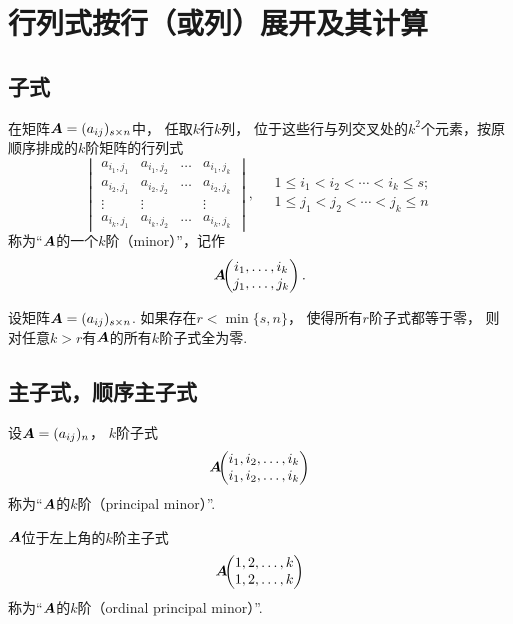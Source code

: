 \section{行列式按行（或列）展开及其计算}
\subsection{子式}
\begin{definition}
在矩阵\(\boldsymbol{A}=(a_{ij})_{s \times n}\)中，
任取\(k\)行\(k\)列，
位于这些行与列交叉处的\(k^2\)个元素，按原顺序排成的\(k\)阶矩阵的行列式\[
	\begin{vmatrix}
		a_{i_1,j_1} & a_{i_1,j_2} & \dots & a_{i_1,j_k} \\
		a_{i_2,j_1} & a_{i_2,j_2} & \dots & a_{i_2,j_k} \\
		\vdots & \vdots & & \vdots \\
		a_{i_k,j_1} & a_{i_k,j_2} & \dots & a_{i_k,j_k}
	\end{vmatrix},
	\quad
	\begin{array}{c}
		1 \leq i_1 < i_2 < \dotsb < i_k \leq s; \\
		1 \leq j_1 < j_2 < \dotsb < j_k \leq n
	\end{array}
\]称为“\(\boldsymbol{A}\)的一个\(k\)阶（minor）”，记作\[
	\MatrixMinor\A{
		\AutoTuple{i}{k} \\
		\AutoTuple{j}{k}
	}.
\]
\end{definition}

\begin{property}
设矩阵\(\boldsymbol{A} = (a_{ij})_{s \times n}\).
如果存在\(r < \min\{s,n\}\)，
使得所有\(r\)阶子式都等于零，
则对任意\(k > r\)有\(\boldsymbol{A}\)的所有\(k\)阶子式全为零.
\end{property}

\subsection{主子式，顺序主子式}
\begin{definition}
设\(\boldsymbol{A}=(a_{ij})_n\)，
\(k\)阶子式\[
	\boldsymbol{A}\kern-3.8pt\begin{pmatrix}
		i_1,i_2,\dotsc,i_k \\
		i_1,i_2,\dotsc,i_k
	\end{pmatrix}
\]
称为“\(\boldsymbol{A}\)的\(k\)阶（principal minor）”.

\(\boldsymbol{A}\)位于左上角的\(k\)阶主子式\[
	\boldsymbol{A}\kern-3.8pt\begin{pmatrix}
		1,2,\dotsc,k \\
		1,2,\dotsc,k
	\end{pmatrix}
\]称为“\(\boldsymbol{A}\)的\(k\)阶（ordinal principal minor）”.
\end{definition}

